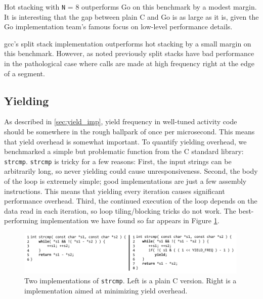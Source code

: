 \documentclass[acmsmall,anonymous,review]{acmart}\settopmatter{printfolios=true,printccs=false,printacmref=false}
\begin{document}
Hot stacking with \texttt{N} = 8 outperforms Go on this benchmark by a modest margin.
It is interesting that the gap between plain C and Go is as large as it is, given the Go implementation team's famous focus on low-level performance details.

gcc's split stack implementation outperforms hot stacking by a small margin on this benchmark.
However, as noted previously split stacks have bad performance in the pathological case where calls are made at high frequency right at the edge of a segment.

\subsection{Yielding}

As described in \textsection\ref{sec:yield_imp}, yield frequency in well-tuned activity code should be somewhere in the rough ballpark of once per microsecond.
This means that yield overhead is somewhat important.
To quantify yielding overhead, we benchmarked a simple but problematic function from the C standard library: \texttt{strcmp}.
\texttt{strcmp} is tricky for a few reasons:
First, the input strings can be arbitrarily long, so never yielding could cause unresponsiveness.
Second, the body of the loop is extremely simple; good implementations are just a few assembly instructions.
This means that yielding every iteration causes significant performance overhead.
Third, the continued execution of the loop depends on the data read in each iteration, so loop tiling/blocking tricks do not work.
The best-performing implementation we have found so far appears in Figure \ref{fig:strcmp}.

\begin{figure}
\includegraphics[width=0.99\textwidth]{Code/strcmps}
\caption{Two implementations of \texttt{strcmp}.
  Left is a plain C version.
  Right is a \charcoal{} implementation aimed at minimizing yield overhead.}

\label{fig:strcmp}

\end{figure}
\end{document}
